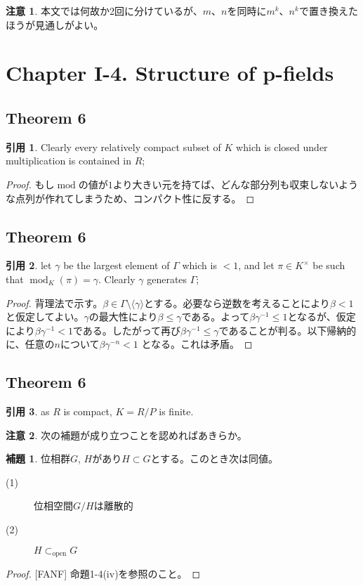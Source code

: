 \documentclass[12pt]{jsarticle}%
\renewenvironment{leftbar}{%
  \renewcommand\FrameCommand{\vrule width 1pt \hspace{10pt}}%
  \MakeFramed {\advance\hsize-\width \FrameRestore}}%
 {\endMakeFramed}
\newcommand{\barquo}[1]{\begin{leftbar} \begin{quo} #1 \end{quo} \end{leftbar}}%
\newcommand{\bfsubsection}[1]{\subsection*{\textbf{#1}}}
\newcommand{\bfsection}[1]{\section*{\textbf{#1}}}
\theoremstyle{definition}%
\newtheorem*{lemma}{補題}
\newcommand{\lem}[1]{\begin{oframed} \begin{lemma} #1 \end{lemma} \end{oframed}}%
\newtheorem*{rem}{注意}
\newtheorem*{quo}{引用}
\newcommand{\kakko}[1]{ \langle #1  \rangle}%
\newcommand{\opsub}{\subset_{\text{open}}}%
\DeclareMathOperator{\module}{mod}%
\newcommand{\grg}{{\gamma}}
\newcommand{\grG}{{\Gamma}}
\begin{document}
\begin{rem}
本文では何故か2回に分けているが、$m$、$n$を同時に$m^k$、$n^k$で置き換えたほうが見通しがよい。
\end{rem}

\newpage
\bfsection{Chapter I-4. Structure of p-fields}

\bfsubsection{Theorem 6}
\barquo{
Clearly every relatively compact subset of $K$ which is closed under multiplication is contained in $R$;
}
\begin{proof}
  もし$\module$の値が$1$より大きい元を持てば、どんな部分列も収束しないような点列が作れてしまうため、コンパクト性に反する。
\end{proof}


\bfsubsection{Theorem 6}
\barquo{
let $\grg$ be the largest element of $\grG$ which is $< 1$, and let $\pi \in K^{\times }$ be such that $\module_K(\pi) = \grg$. Clearly $\grg$ generates $\grG$;
}
\begin{proof}
  背理法で示す。$\beta \in \grG \setminus \kakko{\grg} $とする。必要なら逆数を考えることにより$\beta < 1$と仮定してよい。$\grg$の最大性により$\beta \leq \grg$である。よって$\beta \grg^{-1} \leq 1$となるが、仮定により$\beta \grg^{-1} < 1$である。したがって再び$\beta \grg^{-1} \leq \grg$であることが判る。以下帰納的に、任意の$n$について$\beta \grg^{-n} < 1$
  となる。これは矛盾。
\end{proof}


\bfsubsection{Theorem 6}
\barquo{
as $R$ is compact, $K = R/P$ is finite.
}
\begin{rem}
  次の補題が成り立つことを認めればあきらか。
\end{rem}

\lem{
位相群$G$, $H$があり$H \subset G$とする。このとき次は同値。
\begin{description}
  \item[(1)] 位相空間$G/H$は離散的
  \item[(2)] $H \opsub G$
\end{description}
}
\begin{proof}

  [FANF]\cite{FANF} 命題1-4(iv)を参照のこと。
\end{proof}
\end{document}
